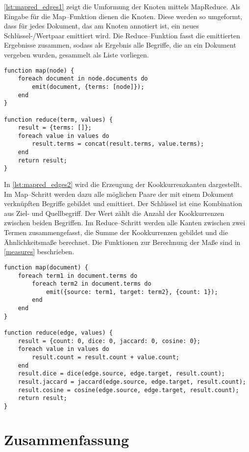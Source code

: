 \cref{lst:mapred_edges1} zeigt die Umformung der Knoten mittels MapReduce. Als Eingabe für die Map--Funktion dienen die Knoten. Diese werden so umgeformt, dass für jedes Dokument, das am Knoten annotiert ist, ein neues Schlüssel-/Wertpaar emittiert wird. Die Reduce--Funktion fasst die emittierten Ergebnisse zusammen, sodass als Ergebnis alle Begriffe, die an ein Dokument vergeben wurden, gesammelt als Liste vorliegen.

\begin{lstlisting}[language=pseudo, label={lst:mapred_edges1}, caption={Umformung der Knoten mit MapReduce}]
function map(node) {
    foreach document in node.documents do
        emit(document, {terms: [node]});
    end
}

function reduce(term, values) {
    result = {terms: []};
    foreach value in values do
        result.terms = concat(result.terms, value.terms);
    end
    return result;
}
\end{lstlisting}

In \cref{lst:mapred_edges2} wird die Erzeugung der Kookkurrenzkanten dargestellt. Im Map--Schritt werden dazu alle möglichen Paare der mit einem Dokument verknüpften Begriffe gebildet und emittiert. Der Schlüssel ist eine Kombination aus Ziel- und Quellbegriff. Der Wert zählt die Anzahl der Kookkurrenzen zwischen beiden Begriffen. Im Reduce--Schritt werden alle Kanten zwischen zwei Termen zusammengefasst, die Summe der Kookkurrenzen gebildet und die Ähnlichkeitsmaße berechnet. Die Funktionen zur Berechnung der Maße sind in \cref{measures} beschrieben.

\begin{lstlisting}[language=pseudo, label={lst:mapred_edges2}, caption={Kantenerzeugung mit MapReduce}]
function map(document) {
    foreach term1 in document.terms do
        foreach term2 in document.terms do
            emit({source: term1, target: term2}, {count: 1});
        end
    end
}

function reduce(edge, values) {
    result = {count: 0, dice: 0, jaccard: 0, cosine: 0};
    foreach value in values do
        result.count = result.count + value.count;
    end
    result.dice = dice(edge.source, edge.target, result.count);
    result.jaccard = jaccard(edge.source, edge.target, result.count);
    result.cosine = cosine(edge.source, edge.target, result.count);
    return result;
}
\end{lstlisting}

\section{Zusammenfassung}